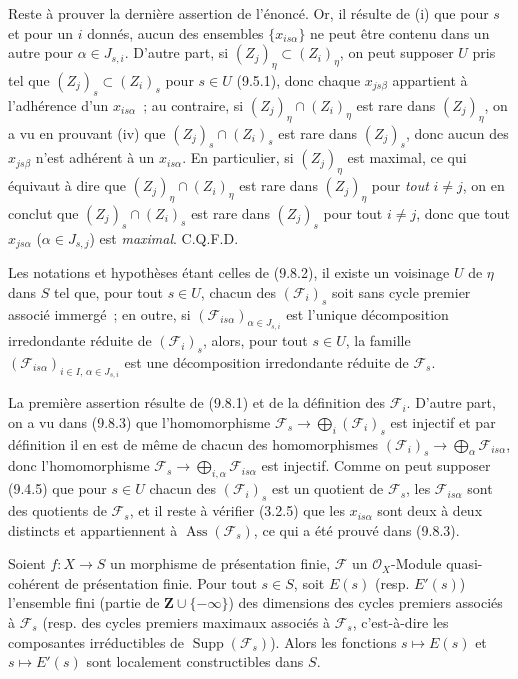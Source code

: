 Reste à prouver la dernière assertion de l'énoncé. Or, il résulte de (i) que
pour $s$ et pour un $i$ donnés, aucun des ensembles $\{x_{is\alpha}\}$ ne peut
être contenu dans un autre pour $\alpha\in J_{s,i}$. D'autre part, si
$(Z_j)_\eta\subset(Z_i)_\eta$, on peut supposer $U$ pris tel que
$(Z_j)_s\subset(Z_i)_s$ pour $s\in U$ (9.5.1), donc chaque $x_{js\beta}$
appartient à l'adhérence d'un $x_{is\alpha}$~; au contraire, si
$(Z_j)_\eta\cap(Z_i)_\eta$ est rare dans $(Z_j)_\eta$, on a vu en prouvant (iv)
que $(Z_j)_s\cap(Z_i)_s$ est rare dans $(Z_j)_s$, donc aucun des $x_{js\beta}$
n'est adhérent à un $x_{is\alpha}$. En particulier, si $(Z_j)_\eta$ est
maximal, ce qui équivaut à dire que $(Z_j)_\eta\cap(Z_i)_\eta$ est rare dans
$(Z_j)_\eta$ pour \emph{tout} $i\neq j$, on en conclut que
$(Z_j)_s\cap(Z_i)_s$ est rare dans $(Z_j)_s$ pour tout $i\neq j$, donc que tout
$x_{js\alpha}$ ($\alpha\in J_{s,j}$) est \emph{maximal}. C.Q.F.D.

\begin{corollary}[9.8.4]
\label{IV.9.8.4-fr}
Les notations et hypothèses étant celles de (9.8.2), il existe un voisinage $U$
de $\eta$ dans $S$ tel que, pour tout $s\in U$, chacun des $(\mathcal F_i)_s$
soit sans cycle premier associé immergé~; en outre, si
$(\mathcal F_{is\alpha})_{\alpha\in J_{s,i}}$ est l'unique décomposition
irredondante réduite de $(\mathcal F_i)_s$, alors, pour tout $s\in U$, la
famille $(\mathcal F_{is\alpha})_{i\in I,\,\alpha\in J_{s,i}}$ est une
décomposition irredondante réduite de $\mathcal F_s$.
\end{corollary}

La première assertion résulte de (9.8.1) et de la définition des
$\mathcal F_i$. D'autre part, on a vu dans (9.8.3) que l'homomorphisme
$\mathcal F_s\to\bigoplus_i(\mathcal F_i)_s$ est injectif et par définition il
en est de même de chacun des homomorphismes
$(\mathcal F_i)_s\to\bigoplus_\alpha\mathcal F_{is\alpha}$, donc
l'homomorphisme $\mathcal F_s\to\bigoplus_{i,\alpha}\mathcal F_{is\alpha}$ est
injectif. Comme on peut supposer (9.4.5) que pour $s\in U$ chacun des
$(\mathcal F_i)_s$ est un quotient de $\mathcal F_s$, les
$\mathcal F_{is\alpha}$ sont des quotients de $\mathcal F_s$, et il reste à
vérifier (3.2.5) que les $x_{is\alpha}$ sont deux à deux distincts et
appartiennent à $\operatorname{Ass}(\mathcal F_s)$, ce qui a été prouvé dans
(9.8.3).

\begin{proposition}[9.8.5]
\label{IV.9.8.5-fr}
Soient $f:X\to S$ un morphisme de présentation finie, $\mathcal F$ un
$\mathcal O_X$-Module quasi-cohérent de présentation finie. Pour tout $s\in S$,
soit $E(s)$ (resp. $E'(s)$) l'ensemble fini (partie de
$\mathbf Z\cup\{-\infty\}$) des dimensions des cycles premiers associés à
$\mathcal F_s$ (resp. des cycles premiers maximaux associés à $\mathcal F_s$,
c'est-à-dire les composantes irréductibles de $\operatorname{Supp}(\mathcal F_s)$).
Alors les fonctions $s\mapsto E(s)$ et $s\mapsto E'(s)$ sont localement
constructibles dans $S$.
\end{proposition}

